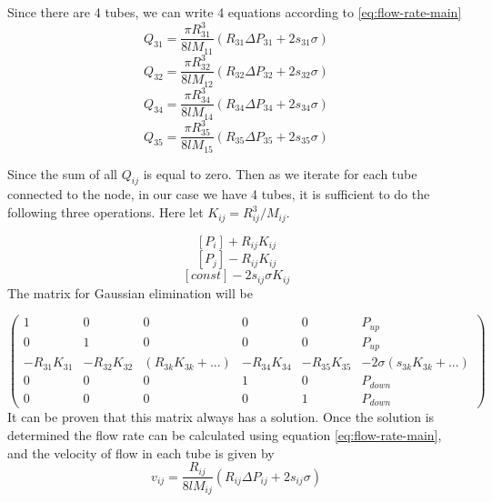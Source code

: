\documentclass[12pt, a4paper]{article}
\begin{document}
Since there are 4 tubes, we can write 4 equations according to \ref{eq:flow-rate-main}
\[ Q_{31} = \frac{\pi R_{31}^3}{8lM_{11}}(R_{31}\Delta P_{31} + 2s_{31}\sigma) \]
\[ Q_{32} = \frac{\pi R_{32}^3}{8lM_{12}}(R_{32}\Delta P_{32} + 2s_{32}\sigma) \]
\[ Q_{34} = \frac{\pi R_{34}^3}{8lM_{14}}(R_{34}\Delta P_{34} + 2s_{34}\sigma) \]
\[ Q_{35} = \frac{\pi R_{35}^3}{8lM_{15}}(R_{35}\Delta P_{35} + 2s_{35}\sigma) \]

Since the sum of all $Q_{ij}$ is equal to zero. Then as we iterate for each tube connected to the node, in our case we have 4 tubes, it is sufficient to do the following three operations. Here let $K_{ij} = R^3_{ij}/{M}_{ij}$.

\[ [P_i] + R_{ij}K_{ij} \]
\[ [P_j] - R_{ij}K_{ij} \]
\[ [const] - 2s_{ij}\sigma K_{ij} \]
The matrix for Gaussian elimination will be

\[ 
\begin{pmatrix}
	1 & 0 & 0 & 0 & 0 & P_{up}\\
	0 & 1 & 0 & 0 & 0 & P_{up}\\
	-R_{31}K_{31} & -R_{32}K_{32} & (R_{3k}K_{3k} + ...) & -R_{34}K_{34} & -R_{35}K_{35} & -2\sigma(s_{3k}K_{3k} + ...)\\
	0 & 0 & 0 & 1 & 0 & P_{down}\\
	0 & 0 & 0 & 0 & 1 & P_{down}
\end{pmatrix}
\]
 It can be proven that this matrix always has a solution. Once the solution is determined the flow rate can be calculated using equation \ref{eq:flow-rate-main}, and the velocity of flow in each tube is given by
\begin{equation} \label{eq:velocity-in-tube}
\boxed{v_{ij} = \frac{R_{ij}}{8lM_{ij}}(R_{ij}\Delta P_{ij} + 2s_{ij}\sigma)}
\end{equation}
\end{document}
